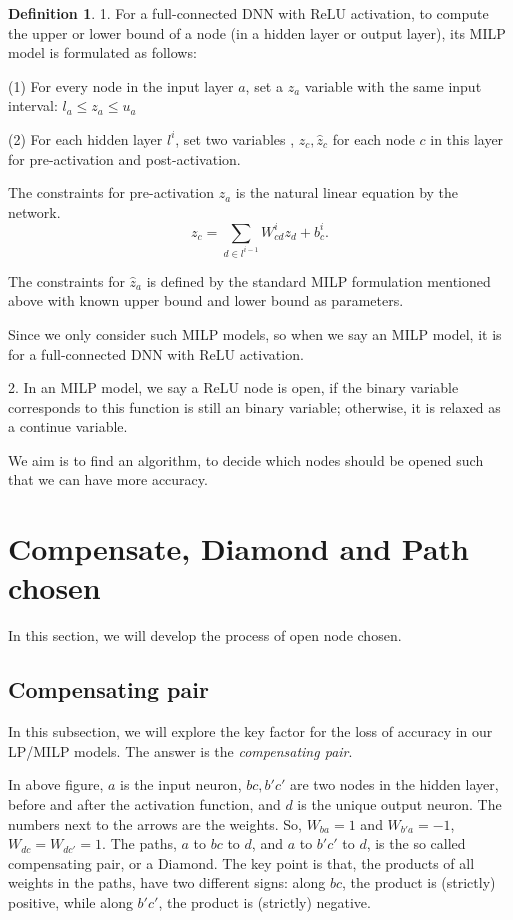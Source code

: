 \documentclass[8pt]{article}
\theoremstyle{definition}
\newtheorem{definition}{Definition}
\newcommand{\ReLU}{\mathrm{ReLU}}
\begin{document}
\begin{definition}
	1. For a full-connected DNN with $\ReLU$ activation, to compute the upper or lower bound of a node (in a hidden layer or output layer), its MILP model is formulated as follows: 
	
	(1) For every node in the input layer $a$, set a $z_a$ variable with the same input interval: $l_a\leq z_a\leq u_a$
	
	(2) For each hidden layer $l^i$, set two variables , $z_c,\hat{z}_c$ for each node $c$ in this layer for pre-activation and post-activation. 
	
	The constraints for pre-activation $z_a$ is the natural linear equation by the network. 	$$z_c=\sum_{d\in l^{i-1}} W^i_{cd} z_d+b^i_c.$$
	
	
	The constraints for $\hat{z}_a$ is defined by the standard MILP formulation mentioned above with known upper bound and lower bound as parameters.
	
	\vspace*{1ex}
	
	Since we only consider such MILP models, so when we say an MILP model, it is for a full-connected DNN with $\ReLU$ activation. 
	
	2. In an MILP model, we say a $\ReLU$ node is open, if the binary variable corresponds to this function is still an binary variable; otherwise, it is relaxed as a continue variable. 
\end{definition}

We aim is to find an algorithm, to decide which nodes should be opened such that we can have more accuracy.

\section{Compensate, Diamond and Path chosen}

In this section, we will develop the process of open node chosen. 



\subsection{Compensating pair}

In this subsection, we will explore the key factor for the loss of accuracy in our LP/MILP models. The answer is the \emph{compensating pair}.


In above figure, $a$ is the input neuron, $bc,b'c'$ are two nodes in the hidden layer, before and after the activation function, and $d$ is the unique output neuron. The numbers next to the arrows are the weights. So, $W_{ba}=1$ and $W_{b'a}=-1$, $W_{dc}=W_{dc'}=1$. The paths, $a$ to $bc$ to $d$, and $a$ to $b'c'$ to $d$, is the so called compensating pair, or a Diamond. The key point is that, the products of all weights in the paths, have two different signs: along $bc$, the product is (strictly) positive, while along $b'c'$, the product is (strictly) negative.
\end{document}
